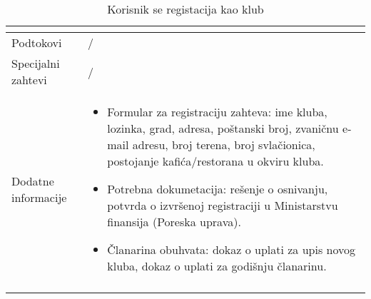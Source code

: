 \documentclass{article}
\begin{document}
\begin{longtable}{| p{} | p{} |}
\begin{itemize}
    \end{itemize}\\
\hline
    Podtokovi & /\\
\hline
    Specijalni zahtevi & /\\
\hline
    Dodatne informacije & \begin{itemize}
        \item Formular za registraciju zahteva: ime kluba, lozinka, grad, adresa, poštanski broj, zvaničnu e-mail adresu, broj terena, broj svlačionica, postojanje kafića/restorana u okviru kluba.
        \item Potrebna dokumetacija: rešenje o osnivanju, potvrda o izvršenoj registraciji u Ministarstvu finansija (Poreska uprava).
        \item Članarina obuhvata: dokaz o uplati za upis novog kluba, dokaz o uplati za godišnju članarinu.
    \end{itemize} \\
\hline
   
\caption{Korisnik se registacija kao klub}
\end{longtable}
\end{document}
